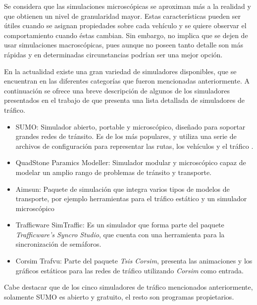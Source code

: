 Se considera que las simulaciones microscópicas se aproximan más a la realidad y que obtienen un nivel de granularidad mayor. Estas características pueden ser útiles cuando se asignan propiedades sobre cada vehículo y se quiere observar el comportamiento cuando éstas cambian. Sin embargo, no implica que se dejen de usar simulaciones macroscópicas, pues aunque no poseen tanto detalle son más rápidas y en determinadas circunstancias podrían ser una mejor opción.

En la actualidad existe una gran variedad de simuladores disponibles, que se encuentran en las diferentes categorías que fueron mencionadas anteriormente. A continuación se ofrece una breve descripción de algunos de los simuladores presentados en el trabajo de \citet{review_trafico} que presenta una lista detallada de simuladores de tráfico.
\begin{itemize}
	\item SUMO: Simulador abierto, portable y microscópico, diseñado para soportar grandes redes de tránsito. Es de los más populares, y utiliza una serie de archivos de configuración para representar las rutas, los vehículos y el tráfico \citep{SUMO}.
	\item QuadStone Paramics Modeller: Simulador modular y microscópico capaz de modelar un amplio rango de problemas de tránsito y transporte.
	\item Aimsun: Paquete de simulación que integra varios tipos de modelos de transporte, por ejemplo herramientas para el tráfico estático y un simulador microscópico
	\item Trafficware SimTraffic: Es un simulador que forma parte del paquete \emph{Trafficware's Syncro Studio}, que cuenta con una herramienta para la sincronización de semáforos.
	\item Corsim Trafvu: Parte del paquete \emph{Tsis Corsim}, presenta las animaciones y los gráficos estáticos para las redes de tráfico utilizando \emph{Corsim} como entrada.
\end{itemize}

Cabe destacar que de los cinco simuladores de tráfico mencionados anteriormente, solamente SUMO es abierto y gratuito, el resto son programas propietarios. 

